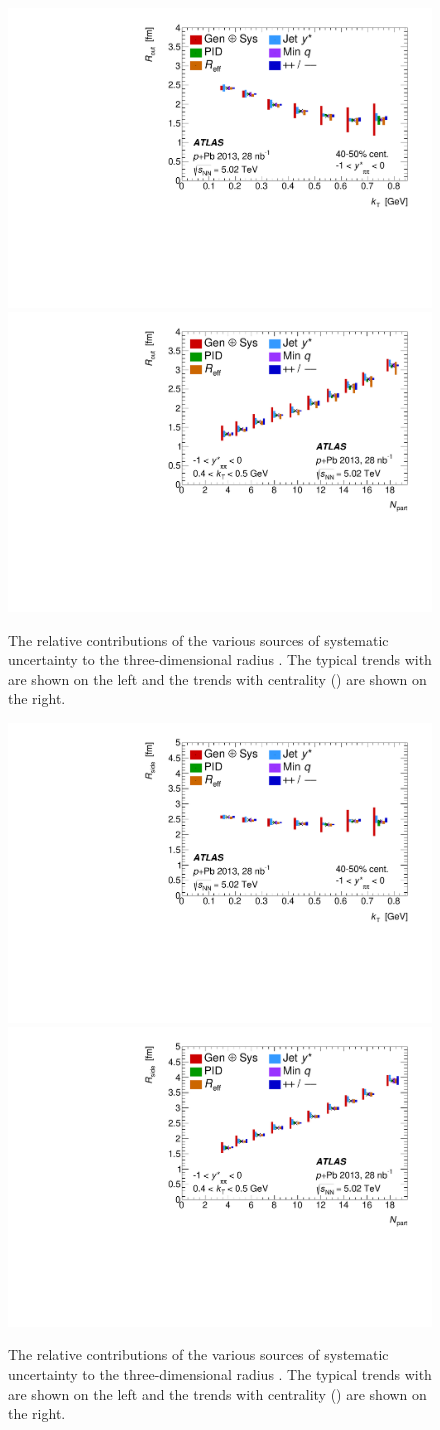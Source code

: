\begin{figure}[t]
\centering
\includegraphics[width=0.49\linewidth]{canqosl_Rout_vs_kt_systs.pdf}
\includegraphics[width=0.49\linewidth]{canqosl_Rout_vs_npart_systs.pdf}\\
\caption{The relative contributions of the various sources of systematic uncertainty to the three-dimensional radius \Rout. The typical trends with \kt are shown on the left and the trends with centrality (\Npart) are shown on the right.}
\label{fig:syst_rout}
\end{figure}

\begin{figure}[t]
\centering
\includegraphics[width=0.49\linewidth]{canqosl_Rside_vs_kt_systs.pdf}
\includegraphics[width=0.49\linewidth]{canqosl_Rside_vs_npart_systs.pdf}\\
\caption{The relative contributions of the various sources of systematic uncertainty to the three-dimensional radius \Rside. The typical trends with \kt are shown on the left and the trends with centrality (\Npart) are shown on the right.}
\label{fig:syst_rside}
\end{figure}

